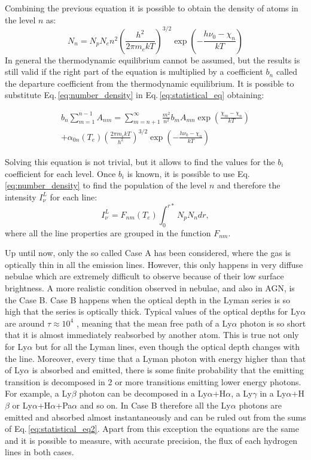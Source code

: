 \documentclass[../main.tex]{subfiles}
\begin{document}
Combining the previous equation it is possible to obtain the density of atoms in the level $n$ as:
\begin{equation}
    \label{eq:number_density}
    N_n = N_pN_en^2\left(\frac{h^2}{2\pi m_e k T}\right)^{3/2} \exp\left(-\frac{h\nu_0 -\chi_n}{kT}\right)
\end{equation}
In general the thermodynamic equilibrium cannot be assumed, but the results is still valid if the right part of the equation is multiplied by a coefficient $b_n$ called the departure coefficient from the thermodynamic equilibrium. It is possible to substitute Eq.\,\ref{eq:number_density} in Eq.\,\ref{eq:statistical_eq} obtaining:

\begin{multline}
    \label{eq:statistical_eq2}
    b_n \sum\limits_{m=1}^{n-1} A_{nm} = \sum\limits_{m=n+1}^{\infty} \frac{m^2}{n^2}b_m A_{mn} \exp\left(\frac{\chi_m-\chi_n}{kT}\right) \\
    + \alpha_{0n}(T_e)\left(\frac{2\pi m_e kT}{h^2}\right)^{3/2}\exp\left(-\frac{h\nu_0 - \chi_n}{kT}\right)
\end{multline}

Solving this equation is not trivial, but it allows to find the values for the $b_i$ coefficient for each level.
Once $b_i$ is known, it is possible to use Eq.\,\ref{eq:number_density} to find the population of the level $n$ and therefore the intensity $I^L_{\nu}$ for each line:
\begin{equation}
    \label{eq:emission_coef}
    I_{\nu}^L = F_{nm}(T_e)\int_0^{r*}N_pN_ndr,   
\end{equation}
where all the line properties are grouped in the function $F_{nm}$.

Up until now, only the so called Case A has been considered, where the gas is optically thin in all the emission lines.
However, this only happens in very diffuse nebulae which are extremely difficult to observe because of their low surface brightness.
A more realistic condition observed in nebulae, and also in AGN, is the Case B.
Case B happens when the optical depth in the Lyman series is so high that the series is optically thick.
Typical values of the optical depths for Ly$\alpha$ are around $\tau \approx 10^4$ \citep{OsterbrockAGN}, meaning that the mean free path of a Ly$\alpha$ photon is so short that it is almost immediately reabsorbed by another atom. 
This is true not only for Ly$\alpha$ but for all the Lyman lines, even though the optical depth changes with the line.
Moreover, every time that a Lyman photon with energy higher than that of Ly$\alpha$ is absorbed and emitted, there is some finite probability that the emitting transition is decomposed in 2 or more transitions emitting lower energy photons.
For example, a Ly$\beta$ photon can be decomposed in a Ly$\alpha$+H$\alpha$, a Ly$\gamma$ in a Ly$\alpha$+H$\beta$ or Ly$\alpha$+H$\alpha$+Pa$\alpha$ and so on.
In Case B therefore all the Ly$\alpha$ photons are emitted and absorbed almost instantaneously and can be ruled out from the sums of Eq.\,\ref{eq:statistical_eq2}.
Apart from this exception the equations are the same and it is possible to measure, with accurate precision, the flux of each hydrogen lines in both cases.
\end{document}
